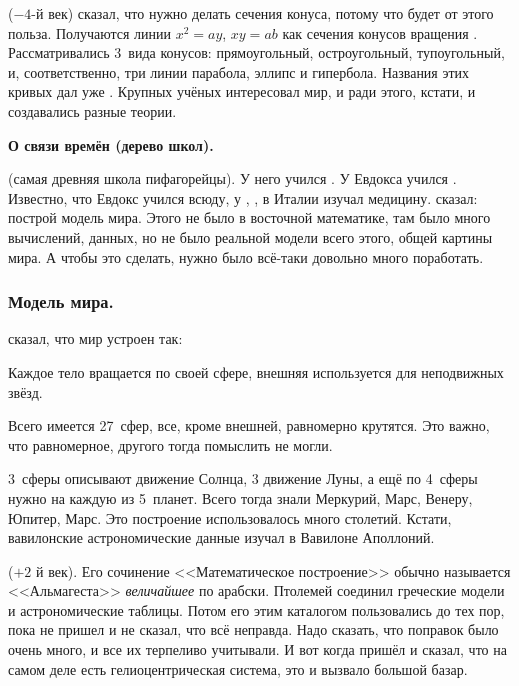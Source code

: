 \documentclass[a4paper,oneside,fleqn,10pt]{article}
\begin{document}
 ($-4$-й век) сказал, что нужно делать сечения конуса,
потому что будет от этого польза.  Получаются линии $x^2 = ay$, $xy =
ab$ как сечения конусов вращения .  Рассматривались 3~вида конусов:
прямоугольный, остроугольный, тупоугольный, и, соответственно, три
линии парабола, эллипс и гипербола. Названия этих кривых дал уже
. Крупных учёных интересовал мир, и ради этого,
кстати, и создавались разные теории.

\textbf{О связи времён (дерево школ).}

 (самая древняя школа пифагорейцы). У него учился
.  У Евдокса учился . Известно, что Евдокс
учился всюду, у , , в
Италии изучал медицину.  сказал: построй модель
мира. Этого не было в восточной математике, там было много вычислений,
данных, но не было реальной модели всего этого, общей картины мира.  А
чтобы это сделать, нужно было всё-таки довольно много поработать.

\subsubsection{Модель мира.}

 сказал, что мир устроен так:

\begin{items}{-2}
\item Каждое тело вращается по своей сфере, внешняя используется для
  неподвижных звёзд.
\item Всего имеется 27~сфер, все, кроме внешней, равномерно
  крутятся. Это важно, что равномерное, другого тогда помыслить не
  могли.
\item 3~сферы описывают движение Солнца, 3 движение Луны, а ещё по
  4~сферы нужно на каждую из 5~планет.  Всего тогда знали Меркурий,
  Марс, Венеру, Юпитер, Марс. Это построение использовалось много
  столетий. Кстати, вавилонские астрономические данные изучал в
  Вавилоне Аполлоний.
\end{items}

 ($+2$ й век).  Его
сочинение <<Математическое построение>> обычно называется
<<Альмагеста>> \emph{величайшее} по арабски. Птолемей соединил
греческие модели и астрономические таблицы. Потом его этим каталогом
пользовались до тех пор, пока  не пришел и не сказал, что
всё неправда.  Надо сказать, что поправок было очень много, и все их
терпеливо учитывали.  И вот когда  пришёл и сказал, что
на самом деле есть гелиоцентрическая система, это и вызвало большой
базар.
\end{document}
